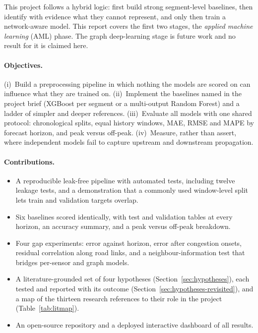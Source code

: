 \documentclass[11pt,a4paper]{article}
\begin{document}
This project follows a hybrid logic: first build strong segment-level baselines, then identify with evidence what they cannot represent, and only then train a network-aware model.
This report covers the first two stages, the \emph{applied machine learning} (AML) phase.
The graph deep-learning stage is future work and no result for it is claimed here.

\paragraph{Objectives.}
(i)~Build a preprocessing pipeline in which nothing the models are scored on can influence what they are trained on.
(ii)~Implement the baselines named in the project brief (XGBoost per segment or a multi-output Random Forest) and a ladder of simpler and deeper references.
(iii)~Evaluate all models with one shared protocol: chronological splits, equal history windows, MAE, RMSE and MAPE by forecast horizon, and peak versus off-peak.
(iv)~Measure, rather than assert, where independent models fail to capture upstream and downstream propagation.

\paragraph{Contributions.}
\begin{itemize}
  \item A reproducible leak-free pipeline with \TestsTotal{} automated tests, including twelve leakage tests, and a demonstration that a commonly used window-level split lets train and validation targets overlap.
  \item Six baselines scored identically, with test and validation tables at every horizon, an accuracy summary, and a peak versus off-peak breakdown.
  \item Four gap experiments: error against horizon, error after congestion onsets, residual correlation along road links, and a neighbour-information test that bridges per-sensor and graph models.
  \item A literature-grounded set of four hypotheses (Section~\ref{sec:hypotheses}), each tested and reported with its outcome (Section~\ref{sec:hypotheses-revisited}), and a map of the thirteen research references to their role in the project (Table~\ref{tab:litmap}).
  \item An open-source repository and a deployed interactive dashboard of all results.
\end{itemize}
\end{document}
